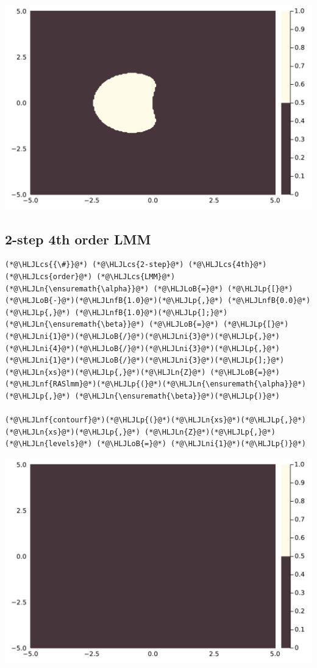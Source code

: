 \documentclass[12pt,a4paper]{article}
\newcommand{\HLJLn}[1]{#1}
\newcommand{\HLJLnf}[1]{\textcolor[RGB]{66,102,213}{#1}}
\newcommand{\HLJLnfB}[1]{\textcolor[RGB]{59,151,46}{#1}}
\newcommand{\HLJLni}[1]{\textcolor[RGB]{59,151,46}{#1}}
\newcommand{\HLJLoB}[1]{\textcolor[RGB]{102,102,102}{\textbf{#1}}}
\newcommand{\HLJLp}[1]{#1}
\newcommand{\HLJLcs}[1]{\textcolor[RGB]{153,153,119}{\textit{#1}}}
\begin{document}
\includegraphics[width=\linewidth]{figures/ass_4_report_2_1.pdf}

\subsection{2-step 4th order LMM}

\begin{lstlisting}
(*@\HLJLcs{{\#}}@*) (*@\HLJLcs{2-step}@*) (*@\HLJLcs{4th}@*) (*@\HLJLcs{order}@*) (*@\HLJLcs{LMM}@*)
(*@\HLJLn{\ensuremath{\alpha}}@*) (*@\HLJLoB{=}@*) (*@\HLJLp{[}@*)(*@\HLJLoB{-}@*)(*@\HLJLnfB{1.0}@*)(*@\HLJLp{,}@*) (*@\HLJLnfB{0.0}@*)(*@\HLJLp{,}@*) (*@\HLJLnfB{1.0}@*)(*@\HLJLp{];}@*) (*@\HLJLn{\ensuremath{\beta}}@*) (*@\HLJLoB{=}@*) (*@\HLJLp{[}@*)(*@\HLJLni{1}@*)(*@\HLJLoB{/}@*)(*@\HLJLni{3}@*)(*@\HLJLp{,}@*) (*@\HLJLni{4}@*)(*@\HLJLoB{/}@*)(*@\HLJLni{3}@*)(*@\HLJLp{,}@*) (*@\HLJLni{1}@*)(*@\HLJLoB{/}@*)(*@\HLJLni{3}@*)(*@\HLJLp{];}@*)
(*@\HLJLn{xs}@*)(*@\HLJLp{,}@*)(*@\HLJLn{Z}@*) (*@\HLJLoB{=}@*) (*@\HLJLnf{RASlmm}@*)(*@\HLJLp{(}@*)(*@\HLJLn{\ensuremath{\alpha}}@*)(*@\HLJLp{,}@*) (*@\HLJLn{\ensuremath{\beta}}@*)(*@\HLJLp{)}@*)

(*@\HLJLnf{contourf}@*)(*@\HLJLp{(}@*)(*@\HLJLn{xs}@*)(*@\HLJLp{,}@*) (*@\HLJLn{xs}@*)(*@\HLJLp{,}@*) (*@\HLJLn{Z}@*)(*@\HLJLp{,}@*) (*@\HLJLn{levels}@*) (*@\HLJLoB{=}@*) (*@\HLJLni{1}@*)(*@\HLJLp{)}@*)
\end{lstlisting}

\includegraphics[width=\linewidth]{figures/ass_4_report_3_1.pdf}
\end{document}
